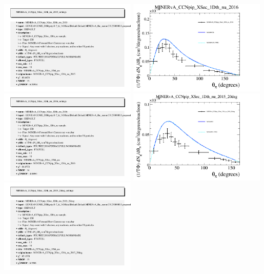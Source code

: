 \documentclass{article}
\begin{document}
\includegraphics[width=0.49\textwidth]{figures/nuisance_MINERvA_CCNpip_XSec_1Dth_nu_2015_info.png}
\centering
\includegraphics[width=0.49\textwidth]{figures/nuisance_MINERvA_CCNpip_XSec_1Dth_nu_2016_comp.png}
\includegraphics[width=0.49\textwidth]{figures/nuisance_MINERvA_CCNpip_XSec_1Dth_nu_2016_info.png}
\centering
\includegraphics[width=0.49\textwidth]{figures/nuisance_MINERvA_CCNpip_XSec_1Dth_nu_2015_20deg_comp.png}
\includegraphics[width=0.49\textwidth]{figures/nuisance_MINERvA_CCNpip_XSec_1Dth_nu_2015_20deg_info.png}
\end{document}
